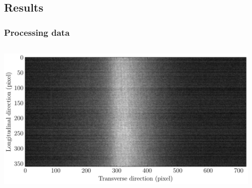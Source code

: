 \begin{frame}[t]
\end{frame}

\subsection{Results}
\begin{frame}
  \frametitle{Processing data}
  \begin{columns}[T]
    \begin{column}{0.45\textwidth}
      \includegraphics[width=1\textwidth]{04_Test/fig/fig000_image_beam}
    \end{column}
    \begin{column}{0.45\textwidth}

\end{column}
\end{columns}
\end{frame}
